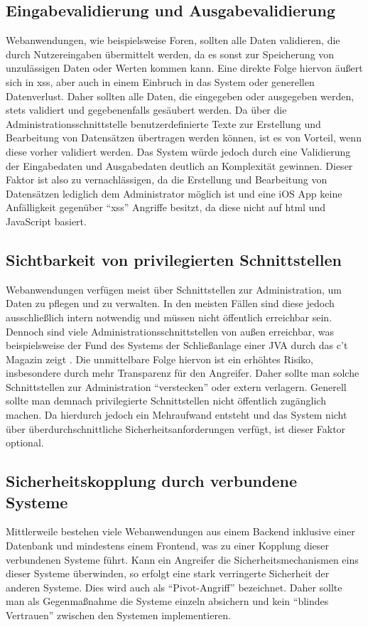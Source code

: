 \subsection{Eingabevalidierung und Ausgabevalidierung}
Webanwendungen, wie beispielsweise Foren, sollten alle Daten validieren, die durch Nutzereingaben übermittelt werden, da es sonst zur Speicherung von unzulässigen Daten oder Werten kommen kann. Eine direkte Folge hiervon äußert sich in \gls{xss}, aber auch in einem Einbruch in das System oder generellen Datenverlust.
Daher sollten alle Daten, die eingegeben oder ausgegeben werden, stets validiert und gegebenenfalls gesäubert werden.
Da über die Administrationsschnittstelle benutzerdefinierte Texte zur Erstellung und Bearbeitung von Datensätzen übertragen werden können, ist es von Vorteil, wenn diese vorher validiert werden. Das System würde jedoch durch eine Validierung der Eingabedaten und Ausgabedaten deutlich an Komplexität gewinnen. Dieser Faktor ist also zu vernachlässigen, da die Erstellung und Bearbeitung von Datensätzen lediglich dem Administrator möglich ist und eine iOS App keine Anfälligkeit gegenüber \enquote{xss} Angriffe besitzt, da diese nicht auf \gls{html} und JavaScript basiert.

\subsection{Sichtbarkeit von privilegierten Schnittstellen}
Webanwendungen verfügen meist über Schnittstellen zur Administration, um Daten zu pflegen und zu verwalten.
In den meisten Fällen sind diese jedoch ausschließlich intern notwendig und müssen nicht öffentlich erreichbar sein.
Dennoch sind viele Administrationsschnittstellen von außen erreichbar, was beispielsweise der Fund des Systems der Schließanlage einer JVA durch das c’t Magazin zeigt \cite[S.~78]{ct}.
Die unmittelbare Folge hiervon ist ein erhöhtes Risiko, insbesondere durch mehr Transparenz für den Angreifer.
Daher sollte man solche Schnittstellen zur Administration \enquote{verstecken} oder extern verlagern.
Generell sollte man demnach privilegierte Schnittstellen nicht öffentlich zugänglich machen. Da hierdurch jedoch ein Mehraufwand entsteht und das System nicht über überdurchschnittliche Sicherheitsanforderungen verfügt, ist dieser Faktor optional.

\subsection{Sicherheitskopplung durch verbundene Systeme}
Mittlerweile bestehen viele Webanwendungen aus einem Backend inklusive einer Datenbank und mindestens einem Frontend, was zu einer Kopplung dieser verbundenen Systeme führt. Kann ein Angreifer die Sicherheitsmechanismen eins dieser Systeme überwinden, so erfolgt eine stark verringerte Sicherheit der anderen Systeme. Dies wird auch als \enquote{Pivot-Angriff} bezeichnet.
Daher sollte man als Gegenmaßnahme die Systeme einzeln absichern und kein \enquote{blindes Vertrauen} zwischen den Systemen implementieren.

